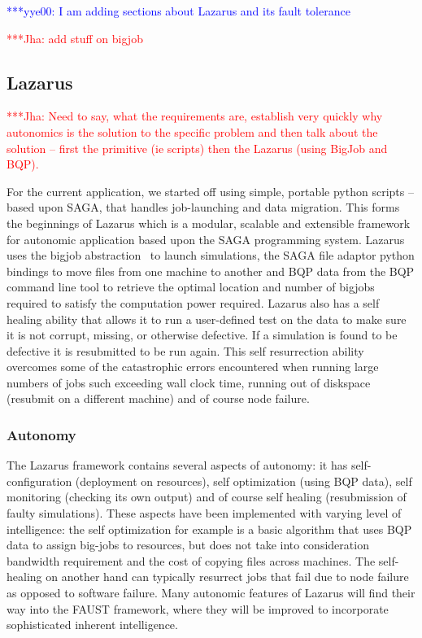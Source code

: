 \documentclass[conference,final]{IEEEtran}
\newcommand{\jhanote}[1]{ {\textcolor{red} { ***Jha: #1 }}}
\newcommand{\yyenote}[1]{ {\textcolor{blue} { ***yye00: #1 }}}
\begin{document}
\yyenote{I am adding sections about Lazarus and its fault tolerance}

\jhanote{add stuff on bigjob}

\subsection{Lazarus}

\jhanote{Need to say, what the requirements are, establish very
  quickly why autonomics is the solution to the specific problem and
  then talk about the solution -- first the primitive (ie scripts)
  then the Lazarus (using BigJob and BQP).}


For the current application, we started off using simple, portable
python scripts -- based upon SAGA, that handles job-launching and data
migration. This forms the beginnings of Lazarus which is a modular,
scalable and extensible framework for autonomic application based upon
the SAGA programming system.  Lazarus uses the bigjob
abstraction~\cite{ICCS_paper, saga_royalsoc} to launch simulations,
the SAGA file adaptor python bindings to move files from one machine
to another and BQP data from the BQP command line tool to retrieve the
optimal location and number of bigjobs required to satisfy the
computation power required. Lazarus also has a self healing ability
that allows it to run a user-defined test on the data to make sure it
is not corrupt, missing, or otherwise defective. If a simulation is
found to be defective it is resubmitted to be run again. This self
resurrection ability overcomes some of the catastrophic errors
encountered when running large numbers of jobs such exceeding wall
clock time, running out of diskspace (resubmit on a different machine)
and of course node failure.

\subsubsection{Autonomy}
The Lazarus framework contains several aspects of autonomy: it has
self-configuration (deployment on resources), self optimization (using
BQP data), self monitoring (checking its own output) and of course
self healing (resubmission of faulty simulations). These aspects have
been implemented with varying level of intelligence: the self
optimization for example is a basic algorithm that uses BQP data to
assign big-jobs to resources, but does not take into consideration
bandwidth requirement and the cost of copying files across
machines. The self-healing on another hand can typically resurrect
jobs that fail due to node failure as opposed to software
failure. Many autonomic features of Lazarus will find their way into
the FAUST framework, where they will be improved to incorporate
sophisticated inherent intelligence.  
\end{document}
